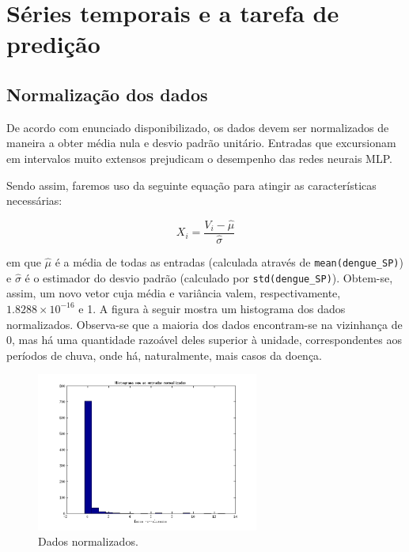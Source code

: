\section{Séries temporais e a tarefa de predição}


\setcounter{subsection}{-1}
\subsection{Normalização dos dados}

	De acordo com enunciado disponibilizado, os dados devem ser normalizados de
	maneira a obter média nula e desvio padrão unitário. Entradas que excursionam
	em intervalos muito extensos prejudicam o desempenho das redes neurais MLP.
	
	\vspace{12pt}
	
	Sendo assim, faremos uso da seguinte equação para atingir as características
	necessárias:
	
	\begin{equation}
	X_i = \frac{V_i - \hat{\mu}}{\hat{\sigma}}
	\end{equation}
	
	em que \(\hat{\mu}\) é a média de todas as entradas (calculada através de
	\texttt{mean(dengue\_SP)}) e \(\hat{\sigma}\) é o estimador do desvio padrão
	(calculado por \texttt{std(dengue\_SP)}). Obtem-se, assim, um novo vetor cuja
	média e variância valem, respectivamente, \(1.8288\times10^{-16}\) e 1. A
	figura à seguir mostra um histograma dos dados normalizados. Observa-se que a
	maioria dos dados encontram-se na vizinhança de 0, mas há uma quantidade
	razoável deles superior à unidade, correspondentes aos períodos de chuva, onde
	há, naturalmente, mais casos da doença.
	
	\begin{figure}[H]
			\centering
			  \includegraphics[width=0.65\textwidth]{image/hist_normalizados}
			  \caption{Dados normalizados.} 
			  \label{hist3}
	\end{figure}
	
